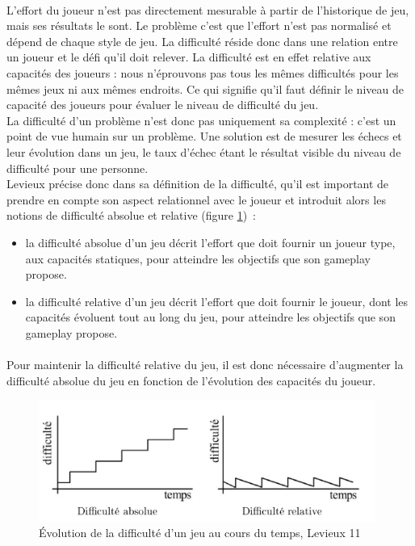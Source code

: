 \paragraph{}L’effort du joueur n’est pas directement mesurable à partir de l’historique de jeu, mais ses résultats le sont. Le problème c’est que l’effort n’est pas normalisé et dépend de chaque style de jeu. La difficulté réside donc dans une relation entre un joueur et le défi qu’il doit relever. La difficulté est en effet relative aux capacités des joueurs : nous n’éprouvons pas tous les mêmes difficultés pour les mêmes jeux ni aux mêmes endroits. Ce qui signifie qu’il faut définir le niveau de capacité des joueurs pour évaluer le niveau de difficulté du jeu.\\
La difficulté d’un problème n'est donc pas uniquement sa complexité : c’est un point de vue humain sur un problème. Une solution est de mesurer les échecs et leur évolution dans un jeu, le taux d’échec étant le résultat visible du niveau de difficulté pour une personne.\\

Levieux précise donc dans sa définition de la difficulté, qu’il est important de prendre en compte son aspect relationnel avec le joueur et introduit alors les notions de difficulté absolue et relative (figure \ref{evolution_difficulte})~:
	\begin{itemize}
		\item la difficulté absolue d’un jeu décrit l’effort que doit fournir un joueur type, aux capacités statiques, pour atteindre les objectifs que son gameplay propose. 
		\item la difficulté relative d’un jeu décrit l’effort que doit fournir le joueur, dont les capacités évoluent tout au long du jeu, pour atteindre les objectifs que son gameplay propose.
	\end{itemize}
\paragraph{}Pour maintenir la difficulté relative du jeu, il est donc nécessaire d’augmenter la difficulté absolue du jeu en fonction de l’évolution des capacités du joueur.

\begin{figure}[!htbp]
	\centering
	\includegraphics[width=11cm]{images/evolution_difficulte.png}
	\caption{Évolution de la difficulté d'un jeu au cours du temps, Levieux 11\cite{Levi11}}
	\label{evolution_difficulte}
\end{figure}

